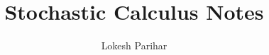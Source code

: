 \documentclass{article}
\title{Stochastic Calculus Notes}
\author{Lokesh Parihar}
\date{}
\begin{document}
\maketitle{}


\tableofcontents %

\newpage






\end{document}
